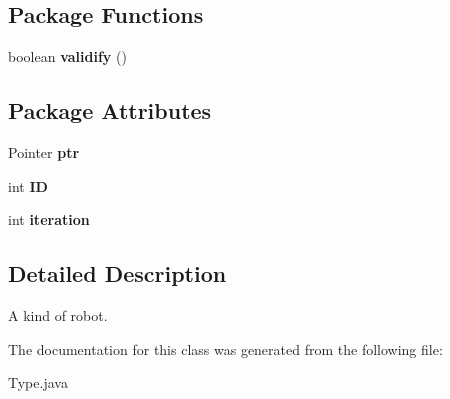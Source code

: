 \subsection*{Package Functions}
\begin{DoxyCompactItemize}
\item 
\hypertarget{classType_ae1042cfd6b5599a83c547d7e24aa29d6}{
boolean {\bfseries validify} ()}
\label{classType_ae1042cfd6b5599a83c547d7e24aa29d6}

\end{DoxyCompactItemize}
\subsection*{Package Attributes}
\begin{DoxyCompactItemize}
\item 
\hypertarget{classType_a877e35cc48379720597cd2d9557f7fea}{
Pointer {\bfseries ptr}}
\label{classType_a877e35cc48379720597cd2d9557f7fea}

\item 
\hypertarget{classType_a9908b06baf48b185f228af3b5a07cb52}{
int {\bfseries ID}}
\label{classType_a9908b06baf48b185f228af3b5a07cb52}

\item 
\hypertarget{classType_a44a879e2a07861e75665d323badd871b}{
int {\bfseries iteration}}
\label{classType_a44a879e2a07861e75665d323badd871b}

\end{DoxyCompactItemize}


\subsection{Detailed Description}
A kind of robot. 

The documentation for this class was generated from the following file:\begin{DoxyCompactItemize}
\item 
Type.java\end{DoxyCompactItemize}
